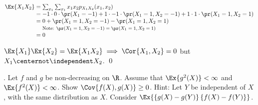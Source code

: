 \documentclass[12pt, letterpaper]{article}
\begin{document}
$
\arraycolsep=1.4pt
\begin{array}{r c l} 
\Ex{X_1 X_2} &=& \sum_{x_1} \sum_{x_1} x_1 x_2 p_{X_1 X_2}(x_1, x_2) 
\\
&=&  
-1 \cdot 0 \cdot \pr(X_1 = -1)
+
1 \cdot -1 \cdot \pr(X_1 = 1, X_2 = -1)
+ 
1 \cdot 1 \cdot \pr(X_1 = 1, X_2 = 1) 
\\
&=&
0 + \pr(X_1 = 1, X_2 = -1) - \pr(X_1 = 1, X_2 = 1)
\\
&& \begin{footnotesize} \text{Note: $\pr(X_1 = 1, X_2 = -1) = \pr(X_1 = 1, X_2 = 1)$} \end{footnotesize}
\\
&=& 0 
\end{array}$  

$\Ex{X_1} \Ex{X_2} = \Ex{X_1 X_2} \implies \Cor{X_1, X_2} = 0$ but $X_1 \centernot\independent X_2$. \qed 

. Let $f$ and $g$ be non-decreasing on $\R$.  Assume that $\Ex{g^2(X)} < \infty$ and $\Ex{ f^2(X)} < \infty$.  Show $\Cov{ f(X), g(X)} \geq 0$.  Hint: Let $Y$ be independent of $X$, with the same distribution as $X$. Consider $\Ex{ \left\{ g(X) - g(Y) \right\} \left\{ f(X) - f(Y) \right\} }$. 
\end{document}
